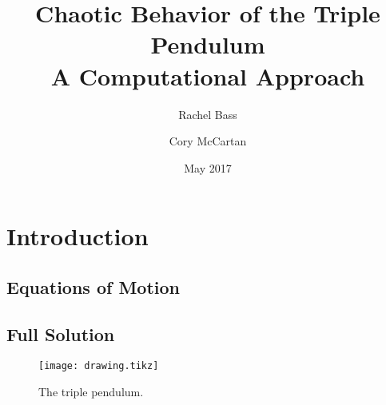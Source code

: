 \documentclass{article}
\title{Chaotic Behavior of the Triple Pendulum \\
    \large A Computational Approach }
\author{Rachel Bass \and Cory McCartan}
\date{May 2017}
\begin{document}
    \maketitle

    \section{Introduction}

    \clearpage
    \begin{appendices}

    \section{Equations of Motion}
    \subsection{Full Solution}

    \begin{wrapfigure}[13]{r}{0.25\textwidth}
        \centering
        \texttt{[image: drawing.tikz]}
        \caption{The triple pendulum.}
    \end{wrapfigure}


\end{appendices}
\end{document}
